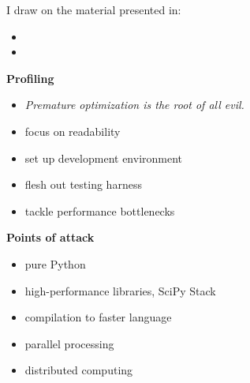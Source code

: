 \begin{frame} I draw on the material presented in:\vspace{0.3cm}

\begin{itemize}\setlength\itemsep{1em}
  \item {}
  \item {}
\end{itemize}

\end{frame}%
\begin{frame}\textbf{Profiling}\vspace{0.3cm}

\begin{itemize}\setlength\itemsep{1em}
    \item \textit{Premature optimization is the root of all evil.}
    \item focus on readability
    \item set up development environment
    \item flesh out testing harness
    \item tackle performance bottlenecks
\end{itemize}

\end{frame}
\begin{frame}\textbf{Points of attack}\vspace{0.3cm}

\begin{itemize}\setlength\itemsep{1em}
    \item pure Python
    \item high-performance libraries, SciPy Stack
    \item compilation to faster language
    \item parallel processing
    \item distributed computing
\end{itemize}

\end{frame}
\begin{frame}
	\begin{figure}[htp]\centering
	\end{figure}
\end{frame}
